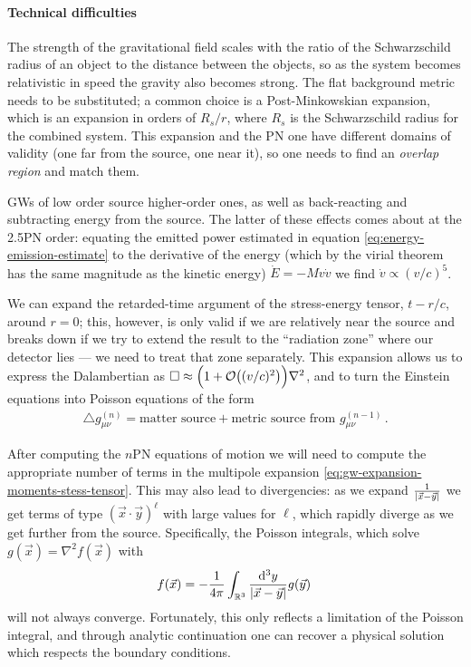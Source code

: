 \documentclass[main.tex]{subfiles}
\begin{document}
\paragraph{Technical difficulties}

The strength of the gravitational field scales with the ratio of the Schwarzschild radius of an object to the distance between the objects, so as the system becomes relativistic in speed the gravity also becomes strong. 
The flat background metric needs to be substituted; a common choice is a Post-Minkowskian expansion, which is an expansion in orders of \(R_s / r\), where \(R_s\) is the Schwarzschild radius for the combined system. 
This expansion and the \ac{PN} one have different domains of validity (one far from the source, one near it), so one needs to find an \emph{overlap region} and match them.  

\acsp{GW} of low order source higher-order ones, as well as back-reacting and subtracting energy from the source. 
The latter of these effects comes about at the 2.5PN order: equating the emitted power estimated in equation \eqref{eq:energy-emission-estimate} to the derivative of the energy (which by the virial theorem has the same magnitude as the kinetic energy) \(\dot{E} = - M v \dot{v}\) we find  \(\dot{v} \propto (v/c)^{5}\). 

We can expand the retarded-time argument of the stress-energy tensor, \(t - r/c\), around \(r = 0\); this, however, is only valid if we are relatively near the source and breaks down if we try to extend the result to the ``radiation zone'' where our detector lies --- we need to treat that zone separately. 
This expansion allows us to express the Dalambertian as \(\square \approx \qty(1 + \order{(v/c)^2}) \nabla^2\), and to turn the Einstein equations into Poisson equations of the form 
%
\begin{align}
\triangle g_{\mu \nu }^{(n)} = \text{matter source} + \text{metric source from \(g_{\mu \nu}^{(n-1)}\)}
\,.
\end{align}

After computing the \(n\)PN equations of motion we will need to compute the appropriate number of terms in the multipole expansion \eqref{eq:gw-expansion-moments-stess-tensor}. 
This may also lead to divergencies: as we expand \( \frac{1}{\abs{\vec{x} - \vec{y}}}\) we get terms of type \((\vec{x} \cdot \vec{y} )^{\ell}\) with large values for \(\ell\), which rapidly diverge as we get further from the source. 
Specifically, the Poisson integrals, which solve \(g(\vec{x}) = \nabla^2 f(\vec{x})\) with 
%
\begin{align}
f(\vec{x}) = - \frac{1}{4 \pi } \int_{\mathbb{R}^3} \frac{ \dd[3]{y}}{\abs{\vec{x} - \vec{y}}} g(\vec{y})
\,
\end{align}
%
will not always converge.
Fortunately, this only reflects a limitation of the Poisson integral, and through analytic continuation one can recover a physical solution which respects the boundary conditions. 
\end{document}

